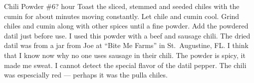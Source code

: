 \begin{recipe}{Chili Powder \#6}{?}{ hour}
Toast the sliced, stemmed and seeded chiles with the cumin for about \unit[3--4]{minutes} moving constantly.  Let chile and cumin cool.
Grind chiles and cumin along with other spices until a fine powder.
Add the powdered datil just before use.
\freeform I used this powder with a beef and sausage chili.  The dried datil was from a jar from Joe at ``Bite Me Farms'' in St.\ Augustine, FL.  I think that I know now why no one uses sausage in their chili.  The powder is spicy, it made me sweat.  I cannot detect the special flavor of the datil pepper.  The chili was espescially red --- perhaps it was the pulla chiles.
\end{recipe}
